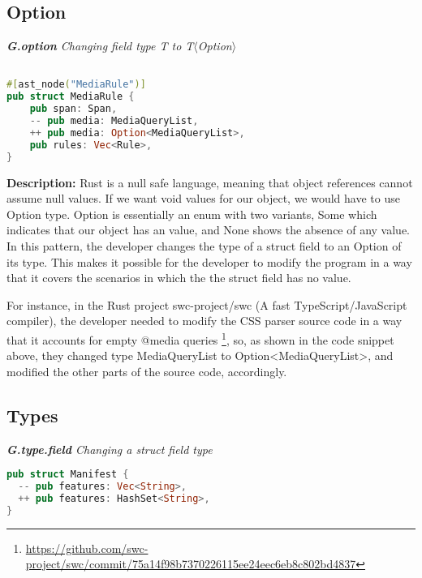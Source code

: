 \subsection{Option}
\vspace{3mm}

\noindent \textit{ \textbf{G.option} Changing field type T to T$\langle$Option$\rangle$}

\begin{lstlisting}[language=Rust, style=colouredRust]

#[ast_node("MediaRule")]
pub struct MediaRule {
    pub span: Span,
    -- pub media: MediaQueryList,
    ++ pub media: Option<MediaQueryList>,
    pub rules: Vec<Rule>,
}

\end{lstlisting}

\noindent \textbf{Description:} Rust is a null safe language, meaning that object references cannot assume null values. If we want void values for our object, we would have to use Option type. Option is essentially an enum with two variants, Some which indicates that our object has an value, and None shows the absence of any value. In this pattern, the developer changes the type of a struct field to an Option of its type. This makes it possible for the developer to modify the program in a way that it covers the scenarios in which the the struct field has no value.

For instance, in the Rust project swc-project/swc (A fast TypeScript/JavaScript compiler), the developer needed to modify the CSS parser source code in a way that it accounts for empty @media queries \footnote{\url{https://github.com/swc-project/swc/commit/75a14f98b7370226115ee24eec6eb8c802bd4837}}, so, as shown in the code snippet above, they changed type MediaQueryList to Option<MediaQueryList>, and modified the other parts of the source code, accordingly.


\subsection{Types}
\vspace{3mm}

\noindent \textit{\label{sec:G.type.field}\textbf{G.type.field} Changing a struct field type}

\begin{lstlisting}[language=Rust, style=colouredRust]
pub struct Manifest {
  -- pub features: Vec<String>,
  ++ pub features: HashSet<String>,
}

\end{lstlisting}

